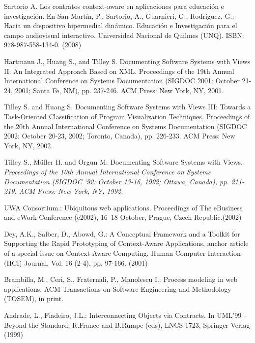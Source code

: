 \begin{thebibliography}{1}
 Sartorio A. {Los contratos context-aware en
aplicaciones para
educación e investigación. En San Martín,  P., Sartorio, A., Guarnieri, G.,
Rodriguez, G.: Hacia un dispositivo hipermedial dinámico. Educación e
Investigación para el campo audiovisual interactivo. Universidad Nacional de
Quilmes (UNQ). ISBN: 978-987-558-134-0. (2008)}


 Hartmann J., Huang S., and Tilley S. {Documenting Software Systems
with Views II: An Integrated Approach  Based on XML.} Proceedings of the 19th
Annual  International Conference on Systems Documentation  (SIGDOC 2001: October
21-24, 2001; Santa Fe, NM), pp.  237-246. ACM Press: New York, NY, 2001.

 Tilley S. and Huang S. {Documenting Software Systems  with Views
III: Towards a Task-Oriented Classification of  Program Visualization
Techniques.} Proceedings of the 20th  Annual International Conference on Systems
Documentation  (SIGDOC 2002: October 20-23, 2002; Toronto, Canada), pp. 
226-233. ACM Press: New York, NY, 2002.

 Tilley S., Müller H. and Orgun M. {Documenting  Software Systems
with Views.} \textit{Proceedings of the 10th  Annual International Conference on
Systems Documentation  (SIGDOC ‘92: October 13-16, 1992; Ottawa, Canada), pp. 
211-219. ACM Press: New York, NY, 1992.}

UWA Consortium.: {Ubiquitous web applications. Proceedings of The eBusiness
and eWork Conference (e2002), 16–18 October, Prague, Czech Republic.(2002)}

Dey, A.K., Salber, D., Abowd, G.: {A Conceptual Framework and a Toolkit for
Supporting the Rapid Prototyping of Context-Aware Applications, anchor article
of a special issue on Context-Aware Computing. Human-Computer Interaction (HCI)
Journal, Vol. 16 (2-4), pp. 97-166. (2001)}


Brambilla,  M., Ceri, S., Fraternali, P., Manolescu I.: {Process modeling in web
applications. ACM Transactions on Software Engineering and Methodology
(TOSEM), in print.}


Andrade, L., Fiadeiro, J.L.: {Interconnecting Objects via Contracts. 
In UML'99 – Beyond the Standard, R.France and B.Rumpe (eds), LNCS 1723,
Springer Verlag (1999)}


\end{thebibliography}
